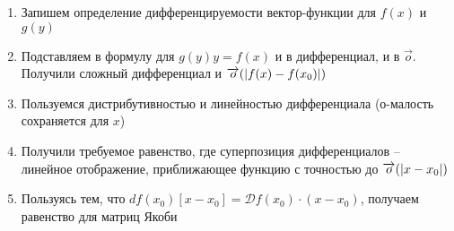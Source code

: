 \begin{enumerate}
    \item Запишем определение дифференцируемости вектор-функции для $f(x)$ и $g(y)$
    \item Подставляем в формулу для $g(y) y = f(x)$ и в дифференциал, и в $\overrightarrow{o}$.
    Получили сложный дифференциал и $\overrightarrow{o}(\abs{f(x) - f(x_0)})$
    \item Пользуемся дистрибутивностью и линейностью дифференциала (о-малость сохраняется для $x$)
    \item Получили требуемое равенство, где суперпозиция дифференциалов -- линейное отображение, приближающее функцию с
    точностью до  $\overrightarrow{o}(\abs{x - x_0})$
    \item Пользуясь тем, что $df(x_0)[x - x_0] = \mathcal{D} f(x_0) \cdot (x - x_0)$, получаем равенство для матриц Якоби
\end{enumerate}